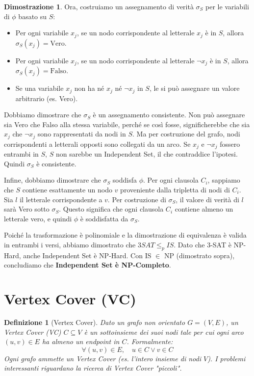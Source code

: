 \documentclass[a4paper, 11pt]{book} %
\newtheorem{definition}[theorem]{Definizione}
\theoremstyle{definition}
\newtheorem*{proof*}{Dimostrazione}
\begin{document}
\begin{proof*}
Ora, costruiamo un assegnamento di verità $\sigma_S$ per le variabili di $\phi$ basato su $S$:
\begin{itemize}
    \item Per ogni variabile $x_j$, se un nodo corrispondente al letterale $x_j$ è in $S$, allora $\sigma_S(x_j) = \text{Vero}$.
    \item Per ogni variabile $x_j$, se un nodo corrispondente al letterale $\neg x_j$ è in $S$, allora $\sigma_S(x_j) = \text{Falso}$.
    \item Se una variabile $x_j$ non ha né $x_j$ né $\neg x_j$ in $S$, le si può assegnare un valore arbitrario (es. Vero).
\end{itemize}
Dobbiamo dimostrare che $\sigma_S$ è un assegnamento consistente. Non può assegnare sia Vero che Falso alla stessa variabile, perché se così fosse, significherebbe che sia $x_j$ che $\neg x_j$ sono rappresentati da nodi in $S$. Ma per costruzione del grafo, nodi corrispondenti a letterali opposti sono collegati da un arco. Se $x_j$ e $\neg x_j$ fossero entrambi in $S$, $S$ non sarebbe un Independent Set, il che contraddice l'ipotesi. Quindi $\sigma_S$ è consistente.

Infine, dobbiamo dimostrare che $\sigma_S$ soddisfa $\phi$.
Per ogni clausola $C_i$, sappiamo che $S$ contiene esattamente un nodo $v$ proveniente dalla tripletta di nodi di $C_i$. Sia $l$ il letterale corrispondente a $v$. Per costruzione di $\sigma_S$, il valore di verità di $l$ sarà Vero sotto $\sigma_S$. Questo significa che ogni clausola $C_i$ contiene almeno un letterale vero, e quindi $\phi$ è soddisfatta da $\sigma_S$.

Poiché la trasformazione è polinomiale e la dimostrazione di equivalenza è valida in entrambi i versi, abbiamo dimostrato che $3SAT \le_p IS$. Dato che 3-SAT è NP-Hard, anche Independent Set è NP-Hard. Con IS $\in$ NP (dimostrato sopra), concludiamo che \textbf{Independent Set è NP-Completo}.
\end{proof*}

\section{Vertex Cover (VC)}

\begin{definition}[Vertex Cover]
Dato un grafo non orientato $G=(V, E)$, un \emph{Vertex Cover} (VC) $C \subseteq V$ è un sottoinsieme dei suoi nodi tale per cui ogni arco $(u,v) \in E$ ha almeno un endpoint in $C$. Formalmente:
\[ \forall (u, v) \in E, \quad u \in C \lor v \in C \]
Ogni grafo ammette un Vertex Cover (es. l'intero insieme di nodi $V$). I problemi interessanti riguardano la ricerca di Vertex Cover "piccoli".
\end{definition}
\end{document}

